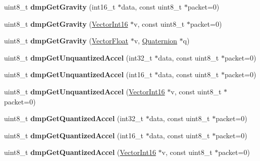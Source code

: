 \begin{DoxyCompactItemize}
uint8\+\_\+t {\bfseries dmp\+Get\+Gravity} (int16\+\_\+t $\ast$data, const uint8\+\_\+t $\ast$packet=0)
\item 
\mbox{\label{classMPU6050_adbeb3de073f6759bf8036a6f29697ea1}} 
uint8\+\_\+t {\bfseries dmp\+Get\+Gravity} (\mbox{\hyperlink{classVectorInt16}{Vector\+Int16}} $\ast$v, const uint8\+\_\+t $\ast$packet=0)
\item 
\mbox{\label{classMPU6050_aa061914109ac5a74ad93c26c903abdd4}} 
uint8\+\_\+t {\bfseries dmp\+Get\+Gravity} (\mbox{\hyperlink{classVectorFloat}{Vector\+Float}} $\ast$v, \mbox{\hyperlink{classQuaternion}{Quaternion}} $\ast$q)
\item 
\mbox{\label{classMPU6050_a1232c8fed01938c6137df40fa2436d31}} 
uint8\+\_\+t {\bfseries dmp\+Get\+Unquantized\+Accel} (int32\+\_\+t $\ast$data, const uint8\+\_\+t $\ast$packet=0)
\item 
\mbox{\label{classMPU6050_a9e427b2ba43ee6e7ba057e7f638836d1}} 
uint8\+\_\+t {\bfseries dmp\+Get\+Unquantized\+Accel} (int16\+\_\+t $\ast$data, const uint8\+\_\+t $\ast$packet=0)
\item 
\mbox{\label{classMPU6050_a814788fea7688802a9f1d91573e94630}} 
uint8\+\_\+t {\bfseries dmp\+Get\+Unquantized\+Accel} (\mbox{\hyperlink{classVectorInt16}{Vector\+Int16}} $\ast$v, const uint8\+\_\+t $\ast$packet=0)
\item 
\mbox{\label{classMPU6050_a34f581edc9b3e12a645940e3f700642e}} 
uint8\+\_\+t {\bfseries dmp\+Get\+Quantized\+Accel} (int32\+\_\+t $\ast$data, const uint8\+\_\+t $\ast$packet=0)
\item 
\mbox{\label{classMPU6050_aa180351de905ea4b06502adefc4411d3}} 
uint8\+\_\+t {\bfseries dmp\+Get\+Quantized\+Accel} (int16\+\_\+t $\ast$data, const uint8\+\_\+t $\ast$packet=0)
\item 
\mbox{\label{classMPU6050_a584cb864d829606f98df54c8962ca934}} 
uint8\+\_\+t {\bfseries dmp\+Get\+Quantized\+Accel} (\mbox{\hyperlink{classVectorInt16}{Vector\+Int16}} $\ast$v, const uint8\+\_\+t $\ast$packet=0)
\item 
\mbox{\label{classMPU6050_a72afcbd02dbc9d2cd02a9b29dfa1e8f2}} 

\end{DoxyCompactItemize}
